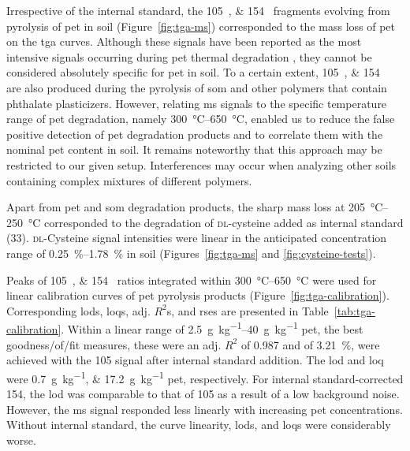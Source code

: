 Irrespective of the internal standard, the \SIlist{105;154}{\mz} fragments evolving from pyrolysis of \ac{pet} in soil (Figure~\ref{fig:tga-ms}) corresponded to the mass loss of \ac{pet} on the \ac{tga} curves.
Although these signals have been reported as the most intensive signals occurring during \ac{pet} thermal degradation \citep{DumichenFast2017,DimitrovAnalysis2013}, they cannot be considered absolutely specific for \ac{pet} in soil.
To a certain extent, \SIlist{105;154}{\mz} are also produced during the pyrolysis of \ac{som} \citep{SchultenThermal1999} and other polymers that contain phthalate plasticizers. However, relating \ac{ms} signals to the specific temperature range of \ac{pet} degradation, namely \SIrange{300}{650}{\degreeCelsius}, enabled us to reduce the false positive detection of \ac{pet} degradation products and to correlate them with the nominal \ac{pet} content in soil.
It remains noteworthy that this approach may be restricted to our given setup. Interferences may occur when analyzing other soils containing complex mixtures of different polymers.

Apart from \ac{pet} and \ac{som} degradation products, the sharp mass loss at \SIrange{205}{250}{\degreeCelsius} corresponded to the degradation of \textsc{dl}-cysteine added as internal standard (\SI{33}{\mz}). \textsc{dl}-Cysteine signal intensities were linear in the anticipated concentration range of \SIrange{0.25}{1.78}{\percent} in soil (Figures~\ref{fig:tga-ms} and \ref{fig:cysteine-tests}).

Peaks of \SIlist{105;154}{\mz} ratios integrated within \SIrange{300}{650}{\degreeCelsius} were used for linear calibration curves of \ac{pet} pyrolysis products (Figure~\ref{fig:tga-calibration}). Corresponding \acp{lod}, \acp{loq}, adj. $R^2$s, and \acp{rse} are presented in Table~\ref{tab:tga-calibration}.
Within a linear range of \SIrange{2.5}{40}{\gram\per\kilo\gram} \ac{pet}, the best goodness\-/of\-/fit measures, these were an adj. $R^2$ of \num{0.987} and  of \SI{3.21}{\percent}, were achieved with the \SI{105}{\mz} signal after internal standard addition.
The \ac{lod} and \ac{loq} were \SIlist{0.7;17.2}{\gram\per\kilo\gram} \ac{pet}, respectively. For internal standard-corrected \SI{154}{\mz}, the \ac{lod} was comparable to that of \SI{105}{\mz} as a result of a low background noise.
However, the \ac{ms} signal responded less linearly with increasing \ac{pet} concentrations. Without internal standard, the curve linearity, \acp{lod}, and \acp{loq} were considerably worse.

